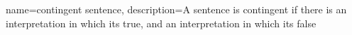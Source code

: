 {
  name={contingent sentence},
  description={A sentence is contingent if there is an interpretation
    in which its true, and an interpretation in which its false}
}










